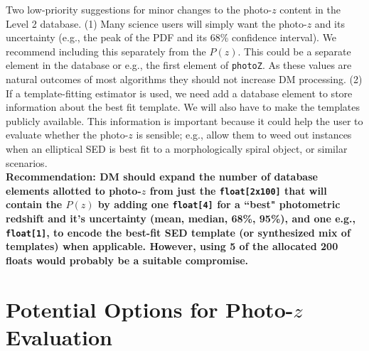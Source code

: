 \documentclass[DM,lsstdraft,toc]{lsstdoc}
\begin{document}
Two low-priority suggestions for minor changes to the photo-$z$ content in the Level 2 database. (1) Many science users will simply want the photo-$z$ and its uncertainty (e.g., the peak of the PDF and its 68\% confidence interval). We recommend including this separately from the $P(z)$. This could be a separate element in the database or e.g., the first element of {\tt photoZ}. As these values are natural outcomes of most algorithms they should not increase DM processing. (2) If a template-fitting estimator is used, we need add a database element to store information about the best fit template. We will also have to make the templates publicly available. This information is important because it could help the user to evaluate whether the photo-$z$ is sensible; e.g., allow them to weed out instances when an elliptical SED is best fit to a morphologically spiral object, or similar scenarios. \\
\textbf{Recommendation: DM should expand the number of database elements allotted to photo-$z$ from just the {\tt float[2x100]} that will contain the $P(z)$ by adding one {\tt float[4]} for a ``best" photometric redshift and it's uncertainty (mean, median, 68\%, 95\%), and one e.g., {\tt float[1]}, to encode the best-fit SED template (or synthesized mix of templates) when applicable. However, using 5 of the allocated 200 floats would probably be a suitable compromise.}



\section{Potential Options for Photo-$z$ Evaluation}\label{sec:options}
\end{document}
